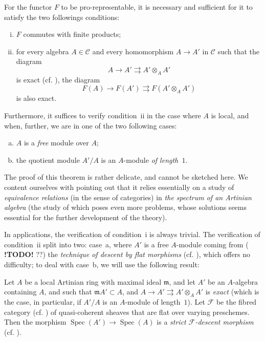 \documentclass{article}
\theoremstyle{plain}
\newenvironment{theorem}[1]
  {\renewcommand\theinnercustomtheorem{#1}\innercustomtheorem}
  {\endinnercustomtheorem}
\theoremstyle{definition}
\newcommand{\cat}[1]{{\mathcal{#1}}}
\newcommand{\fk}[1]{{\mathfrak{#1}}}
\DeclareMathOperator{\Spec}{Spec}
\newcommand{\todo}{\textbf{ !TODO! }}
\newcommand{\oldpage}[1]{\marginpar{\footnotesize$\Big\vert$ \textit{p.~#1}}}
\begin{document}
\begin{theorem}{1}
\label{B-theorem1}
  For the functor $F$ to be pro-representable, it is necessary and sufficient for it to satisfy the two followings conditions:
  \begin{enumerate}[i.]
    \item $F$ commutes with finite products;
    \item for every algebra $A\in\cat{C}$ and every homomorphism $A\to A'$ in $\cat{C}$ such that the diagram
      \[
        A \to A' \rightrightarrows A'\otimes_A A'
      \]
      is exact (cf. \cite[A, Definition~1.2]{3}), the diagram
      \[
        F(A) \to F(A') \rightrightarrows F(A'\otimes_A A')
      \]
\oldpage{195-10}
      is also exact.
  \end{enumerate}

  Furthermore, it suffices to verify condition~ii in the case where $A$ is local, and when, further, we are in one of the two following cases:
  \begin{enumerate}[a.]
    \item $A$ is a \emph{free} module over $A$;
    \item the quotient module $A'/A$ is an $A$-module \emph{of length~$1$}.
  \end{enumerate}
\end{theorem}

The proof of this theorem is rather delicate, and cannot be sketched here.
We content ourselves with pointing out that it relies essentially on a study of \emph{equivalence relations} (in the sense of categories) in \emph{the spectrum of an Artinian algebra} (the study of which poses even more problems, whose solutions seems essential for the further development of the theory).

In applications, the verification of condition~i is always trivial.
The verification of condition~ii split into two: case~a, where $A'$ is a free $A$-module coming from (\todo??) the \emph{technique of descent by flat morphisms} (cf. \cite[Theorems~1, 2, and 3]{3}), which offers no difficulty;
to deal with case~b, we will use the following result:

\begin{theorem}{2}
  \label{B-theorem2}
  Let $A$ be a local Artinian ring with maximal ideal $\fk{m}$, and let $A'$ be an $A$-algebra containing $A$, and such that $\fk{m}A'\subset A$, and $A\to A'\rightrightarrows A'\otimes_A A'$ is \emph{exact} (which is the case, in particular, if $A'/A$ is an $A$-module of length~$1$).
  Let $\cat{F}$ be the fibred category (cf. \cite[A, Definition~1.1]{3}) of quasi-coherent sheaves that are flat over varying preschemes.
  Then the morphism $\Spec(A')\to\Spec(A)$ is a \emph{strict $\cat{F}$-descent morphism} (cf. \cite[A, Definition~1.7]{3}).
\end{theorem}
\end{document}
